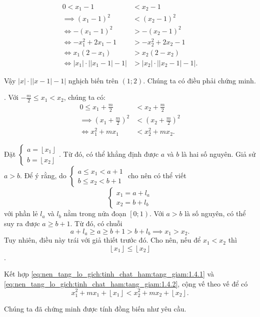 \begin{align*}
   0 < x_1 - 1 &< x_2 - 1 \\
   \implies  \left(x_1 - 1\right)^2 &< \left(x_2 - 1\right)^2 \\
   \iff -\left(x_1 - 1\right)^2 &> -\left(x_2 - 1\right)^2 \\
   \iff -x_1^2 + 2x_1 - 1 &> -x_2^2 + 2x_2 - 1 \\
   \iff x_1 \left(2 - x_1\right) &> x_2\left(2-x_2\right) \\
   \iff |x_1|\cdot \left|\left|x_1 - 1\right| - 1\right| &> |x_2|\cdot \left|\left|x_2 - 1\right| - 1\right|.
\end{align*}

Vậy $|x|\cdot \left|\left|x - 1\right| - 1\right|$ nghịch biến trên $(1; 2)$. Chúng ta có điều phải chứng minh.

. Với $-\frac{m}{2} \leq x_1 < x_2$, chúng ta có:
\begin{align}
   0 \leq x_1 + \frac{m}{2} &< x_2 + \frac{m}{2} \nonumber\\
   \implies \left(x_1 + \frac{m}{2}\right)^2 &< \left(x_2 + \frac{m}{2}\right)^2 \nonumber\\
   \iff x_1^2 + mx_1 &< x_2^2 + mx_2. \label{eq:nen_tang_lo_gich:tinh_chat_ham:tang_giam:1.4.1}
\end{align}

Đặt $\begin{cases}
   a = \left\lfloor x_1 \right\rfloor \\
   b = \left\lfloor x_2 \right\rfloor
\end{cases}$. Từ đó, có thể khẳng định được $a$ và $b$ là hai số nguyên. Giả sử $a > b$. Để ý rằng, do $\begin{cases}
   a\leq x_1 < a + 1 \\
   b \leq x_2 < b + 1
\end{cases}$ cho nên có thể viết $$\begin{cases}
   x_1 = a + l_a \\
   x_2 = b + l_b
\end{cases}$$ với phần lẻ $l_a$ và $l_b$ nằm trong nửa đoạn $\left[0; 1\right)$. Với $a > b$ là số nguyên, có thể suy ra được $a \geq b + 1$. Từ đó, có chuỗi $$a + l_a \geq a \geq b + 1 > b + l_b \implies x_1 > x_2.$$ Tuy nhiên, điều này trái với giả thiết trước đó. Cho nên, nếu để $x_1 < x_2$ thì \begin{equation}
   \left\lfloor x_1 \right\rfloor\leq \left\lfloor x_2 \right\rfloor \label{eq:nen_tang_lo_gich:tinh_chat_ham:tang_giam:1.4.2}
\end{equation}.

Kết hợp \eqref{eq:nen_tang_lo_gich:tinh_chat_ham:tang_giam:1.4.1} và \eqref{eq:nen_tang_lo_gich:tinh_chat_ham:tang_giam:1.4.2}, cộng vế theo vế để có $$x_1^2 + mx_1 + \left\lfloor x_1 \right\rfloor < x_2^2 + mx_2 + \left\lfloor x_2 \right\rfloor.$$

Chúng ta đã chứng minh được tính đồng biến như yêu cầu.